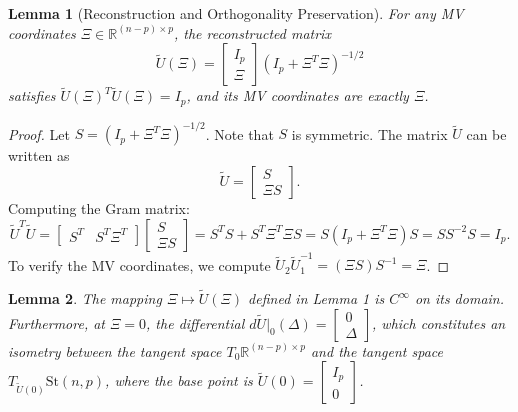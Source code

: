\documentclass[11pt]{article}
\newtheorem{lemma}{Lemma}
\begin{document}
\begin{lemma}[Reconstruction and Orthogonality Preservation] \label{Lemma1}
For any MV coordinates $\Xi \in \mathbb{R}^{(n-p) \times p}$, the reconstructed matrix
$$
\widetilde U(\Xi) = \begin{bmatrix} I_p \\ \Xi \end{bmatrix} (I_p + \Xi^T \Xi)^{-1/2}
$$
satisfies $\widetilde U(\Xi)^T \widetilde U(\Xi) = I_p$, and its MV coordinates are exactly $\Xi$.
\end{lemma}

\begin{proof}
Let $S = (I_p + \Xi^T \Xi)^{-1/2}$. Note that $S$ is symmetric. The matrix $\widetilde U$ can be written as
$$
\widetilde U = \begin{bmatrix} S \\ \Xi S \end{bmatrix}.
$$
Computing the Gram matrix:
$$
\widetilde U^T \widetilde U = \begin{bmatrix} S^T & S^T \Xi^T \end{bmatrix} \begin{bmatrix} S \\ \Xi S \end{bmatrix} = S^T S + S^T \Xi^T \Xi S = S(I_p + \Xi^T \Xi)S = S S^{-2} S = I_p.
$$
To verify the MV coordinates, we compute $\widetilde U_2 \widetilde U_1^{-1} = (\Xi S)S^{-1} = \Xi$.
\end{proof}


\begin{lemma} \label{lem:smooth_iso}
The mapping $\Xi \mapsto \widetilde{U}(\Xi)$ defined in Lemma 1 is $C^\infty$ on its domain. Furthermore, at $\Xi = 0$, the differential $d\widetilde{U}|_0(\Delta) = \begin{bmatrix} 0 \\ \Delta \end{bmatrix}$, which constitutes an isometry between the tangent space $T_0 \mathbb{R}^{(n-p) \times p}$ and the tangent space $T_{\widetilde{U}(0)} \text{St}(n,p)$, where the base point is $\widetilde{U}(0) = \begin{bmatrix} I_p \\ 0 \end{bmatrix}$.
\end{lemma}
\end{document}

